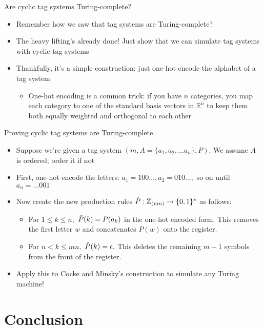 \documentclass[aspectratio=169]{beamer}
\begin{document}
\begin{frame}{Are cyclic tag systems Turing-complete?}
    \pause
    \begin{itemize}
        \item Remember how we saw that tag systems are Turing-complete? \pause
        \item The heavy lifting's already done! Just show that we can simulate tag systems with cyclic tag systems \pause
        \item Thankfully, it's a simple construction: just one-hot encode the alphabet of a tag system \pause
        \begin{itemize}
            \item \textcolor{sigma@mainblue}{One-hot encoding} is a common trick: if you have $n$ categories, you map each category to one of the standard basis vectors in $\mathbb{R}^n$ to keep them both equally weighted and orthogonal to each other
        \end{itemize}
    \end{itemize}
\end{frame}

\begin{frame}{Proving cyclic tag systems are Turing-complete}
\begin{itemize}
    \item Suppose we're given a tag system $(m, A = \{a_1, a_2, \dots a_n\}, P).$ We assume $A$ is ordered; order it if not \pause
    \item First, one-hot encode the letters: $a_1 = 100\dots, a_2 = 010\dots,$ so on until $a_n = \dots001$ \pause
    \item Now create the new production rules $\Hat{P}: \mathbb{Z}_{(mn)} \rightarrow \{0, 1\}^*$ as follows: \pause
    \begin{itemize}
        \item For $1 \leq k \leq n,$ $\Hat{P}(k) = P(a_k)$ in the one-hot encoded form. This removes the first letter $w$ and concatenates $P(w)$ onto the register. \pause
        \item For $n < k \leq mn,$ $\Hat{P}(k) = \epsilon.$ This deletes the remaining $m-1$ symbols from the front of the register.
    \end{itemize} \pause
    \item Apply this to Cocke and Minsky's construction to simulate any Turing machine!
\end{itemize}
\end{frame}

\section{Conclusion}
\frame{\sectionpage}
\end{document}
